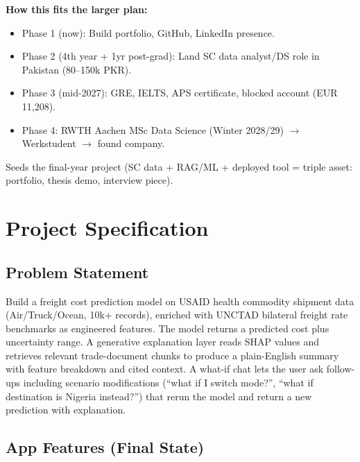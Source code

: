 \documentclass[11pt, a4paper]{article}
\begin{document}
\textbf{How this fits the larger plan:}
\begin{itemize}[noitemsep]
  \item Phase 1 (now): Build portfolio, GitHub, LinkedIn presence.
  \item Phase 2 (4th year + 1yr post-grad): Land SC data analyst/DS role in Pakistan (80--150k PKR).
  \item Phase 3 (mid-2027): GRE, IELTS, APS certificate, blocked account (EUR 11,208).
  \item Phase 4: RWTH Aachen MSc Data Science (Winter 2028/29) $\rightarrow$ Werkstudent $\rightarrow$ found company.
\end{itemize}

Seeds the final-year project (SC data + RAG/ML + deployed tool = triple asset: portfolio, thesis demo, interview piece).

\section{Project Specification}

\subsection{Problem Statement}
Build a freight cost prediction model on USAID health commodity shipment data (Air/Truck/Ocean, 10k+ records), enriched with UNCTAD bilateral freight rate benchmarks as engineered features. The model returns a predicted cost plus uncertainty range. A generative explanation layer reads SHAP values and retrieves relevant trade-document chunks to produce a plain-English summary with feature breakdown and cited context. A what-if chat lets the user ask follow-ups including scenario modifications (``what if I switch mode?'', ``what if destination is Nigeria instead?'') that rerun the model and return a new prediction with explanation.

\subsection{App Features (Final State)}
\end{document}
